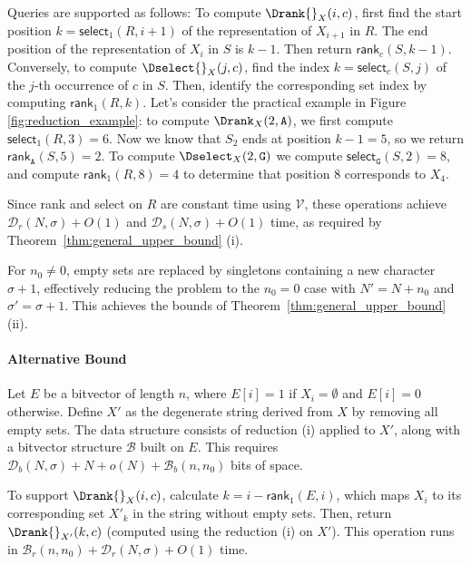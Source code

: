 \noindent Queries are supported as follows: To compute $\Drank{}_X(i, c)$, first find the start position $k = \textsf{select}_1(R, i+1)$ of the representation of $X_{i+1}$ in $R$. The end position of the representation of $X_i$ in $S$ is $k-1$. Then return $\textsf{rank}_c(S, k-1)$. Conversely, to compute $\Dselect{}_X(j, c)$, find the index $k = \textsf{select}_c(S, j)$ of the $j$-th occurrence of $c$ in $S$. Then, identify the corresponding set index by computing $\textsf{rank}_1(R, k)$. Let's consider the practical example in Figure \ref{fig:reduction_example}: to compute $\Drank_X(2,\texttt{A})$, we first compute $\textsf{select}_1(R, 3) = 6$. Now we know that $S_2$ ends at position $k-1=5$, so we return $\textsf{rank}_{\texttt{A}}(S, 5) = 2$. To compute $\Dselect_X(2, \texttt{G})$ we compute $\textsf{select}_{\texttt{G}}(S, 2) = 8$, and compute $\textsf{rank}_1(R, 8) = 4$ to determine that position 8 corresponds to $X_4$.


\noindent Since \textsf{rank} and \textsf{select} on $R$ are constant time using $\mathcal{V}$, these operations achieve $\mathcal{D}_r(N,\sigma) + O(1)$ and $\mathcal{D}_s(N,\sigma) + O(1)$ time, as required by Theorem~\ref{thm:general_upper_bound} (i).


\noindent For $n_0 \neq 0$, empty sets are replaced by singletons containing a new character $\sigma + 1$, effectively reducing the problem to the $n_0 = 0$ case with $N' = N + n_0$ and $\sigma' = \sigma + 1$. This achieves the bounds of Theorem~\ref{thm:general_upper_bound} (ii).

\paragraph{Alternative Bound} Let $E$ be a bitvector of length $n$, where $E[i] = 1$ if $X_i = \emptyset$ and $E[i] = 0$ otherwise. Define $X'$ as the degenerate string derived from $X$ by removing all empty sets. The data structure consists of reduction (i) applied to $X'$, along with a bitvector structure $\mathcal{B}$ built on $E$. This requires $\mathcal{D}_b(N, \sigma) + N + o(N) + \mathcal{B}_b(n, n_0)$ bits of space.

\noindent To support $\Drank{}_X(i, c)$, calculate $k = i - \textsf{rank}_1(E, i)$, which maps $X_i$ to its corresponding set $X'_{k}$ in the string without empty sets. Then, return $\Drank{}_{X'}(k, c)$ (computed using the reduction (i) on $X'$). This operation runs in $\mathcal{B}_r(n, n_0) + \mathcal{D}_r(N, \sigma) + O(1)$ time.

